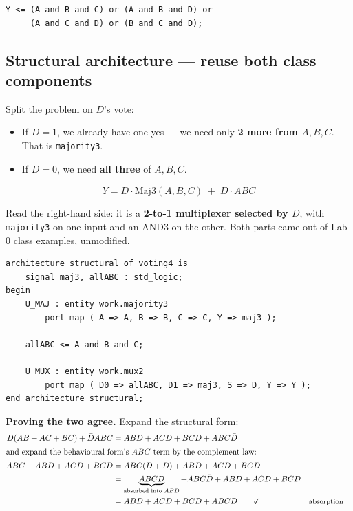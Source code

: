 \documentclass[11pt]{article}
\newcommand{\code}[1]{\texttt{#1}}
\begin{document}
\begin{lstlisting}
Y <= (A and B and C) or (A and B and D) or
     (A and C and D) or (B and C and D);
\end{lstlisting}

\subsection*{Structural architecture --- reuse both class components}

Split the problem on $D$'s vote:

\begin{itemize}[leftmargin=1.6em,itemsep=1pt]
\item If $D = 1$, we already have one yes --- we need only \textbf{2 more from
$A,B,C$}. That is \code{majority3}.
\item If $D = 0$, we need \textbf{all three} of $A,B,C$.
\end{itemize}

\[
Y = D \cdot \mathrm{Maj3}(A,B,C) \;+\; \bar{D} \cdot ABC
\]

Read the right-hand side: it is a \textbf{2-to-1 multiplexer selected by $D$}, with
\code{majority3} on one input and an AND3 on the other. Both parts came out of Lab 0
class examples, unmodified.

\begin{lstlisting}
architecture structural of voting4 is
    signal maj3, allABC : std_logic;
begin
    U_MAJ : entity work.majority3
        port map ( A => A, B => B, C => C, Y => maj3 );

    allABC <= A and B and C;

    U_MUX : entity work.mux2
        port map ( D0 => allABC, D1 => maj3, S => D, Y => Y );
end architecture structural;
\end{lstlisting}

\textbf{Proving the two agree.} Expand the structural form:
\begin{align*}
D(AB + AC + BC) + \bar{D}ABC
  &= ABD + ACD + BCD + ABC\bar{D} \\
\intertext{and expand the behavioural form's $ABC$ term by the complement law:}
ABC + ABD + ACD + BCD
  &= ABC(D + \bar{D}) + ABD + ACD + BCD \\
  &= \underbrace{ABCD}_{\text{absorbed into } ABD} + ABC\bar{D} + ABD + ACD + BCD \\
  &= ABD + ACD + BCD + ABC\bar{D} \qquad\checkmark && \text{\small absorption}
\end{align*}
\end{document}
